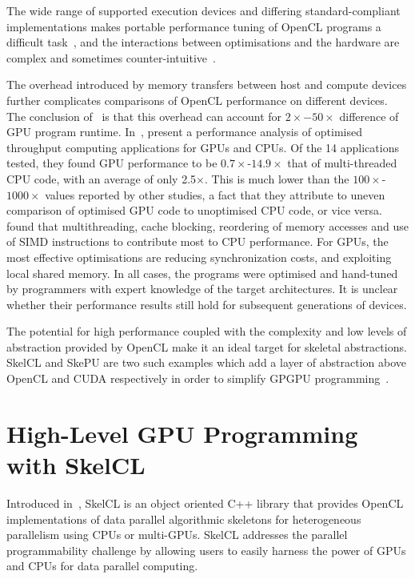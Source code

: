 The wide range of supported execution devices and differing
standard-compliant implementations makes portable performance tuning
of OpenCL programs a difficult task~\cite{Rul2010}, and the
interactions between optimisations and the hardware are complex and
sometimes counter-intuitive~\cite{Ryoo2008}.

The overhead introduced by memory transfers between host and compute
devices further complicates comparisons of OpenCL performance on
different devices. The conclusion of~\cite{Gregg2011} is that this
overhead can account for $2\times-50\times$ difference of GPU program
runtime. In~\cite{Lee2010}, \citeauthor{Lee2010} present a performance
analysis of optimised throughput computing applications for GPUs and
CPUs. Of the 14 applications tested, they found GPU performance to be
$0.7\times$-$14.9\times$ that of multi-threaded CPU code, with an
average of only 2.5$\times$. This is much lower than the
$100\times$-$1000\times$ values reported by other studies, a fact that
they attribute to uneven comparison of optimised GPU code to
unoptimised CPU code, or vice versa. \citeauthor{Lee2010} found that
multithreading, cache blocking, reordering of memory accesses and use
of SIMD instructions to contribute most to CPU performance. For GPUs,
the most effective optimisations are reducing synchronization costs,
and exploiting local shared memory. In all cases, the programs were
optimised and hand-tuned by programmers with expert knowledge of the
target architectures. It is unclear whether their performance results
still hold for subsequent generations of devices.

The potential for high performance coupled with the complexity and low
levels of abstraction provided by OpenCL make it an ideal target for
skeletal abstractions. SkelCL and SkePU are two such examples which
add a layer of abstraction above OpenCL and CUDA respectively in order
to simplify GPGPU programming~\cite{Enmyren2010}.

\section{High-Level GPU Programming with
  SkelCL}\label{sec:skelcl-intro}

Introduced in~\cite{Steuwer2011}, SkelCL is an object oriented C++
library that provides OpenCL implementations of data parallel
algorithmic skeletons for heterogeneous parallelism using CPUs or
multi-GPUs. SkelCL addresses the parallel programmability challenge by
allowing users to easily harness the power of GPUs and CPUs for data
parallel computing.

